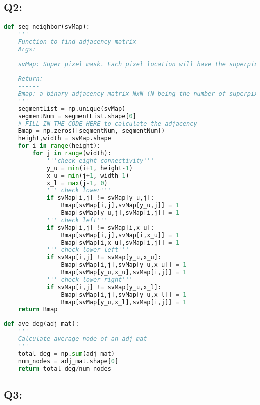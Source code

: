 \documentclass[12pt]{article}
\begin{document}
\subsection*{Q2:}
\begin{lstlisting}[language=Python]
def seg_neighbor(svMap):
	'''
	Function to find adjacency matrix
	Args:
	----
	svMap: Super pixel mask. Each pixel location will have the superpixel label corresponding to it.  
	
	Return:
	------
	Bmap: a binary adjacency matrix NxN (N being the number of superpixels	in svMap). 
	'''
	segmentList = np.unique(svMap)
	segmentNum = segmentList.shape[0]
	# FILL IN THE CODE HERE to calculate the adjacency
	Bmap = np.zeros([segmentNum, segmentNum])
	height,width = svMap.shape
	for i in range(height):
		for j in range(width):
			'''check eight connectivity'''
			y_u = min(i+1, height-1) 
			x_u = min(j+1, width-1)
			x_l = max(j-1, 0)
			''' check lower'''
			if svMap[i,j] != svMap[y_u,j]: 
				Bmap[svMap[i,j],svMap[y_u,j]] = 1
				Bmap[svMap[y_u,j],svMap[i,j]] = 1
			''' check left'''
			if svMap[i,j] != svMap[i,x_u]:
				Bmap[svMap[i,j],svMap[i,x_u]] = 1
				Bmap[svMap[i,x_u],svMap[i,j]] = 1
			''' check lower left'''
			if svMap[i,j] != svMap[y_u,x_u]:
				Bmap[svMap[i,j],svMap[y_u,x_u]] = 1
				Bmap[svMap[y_u,x_u],svMap[i,j]] = 1
			''' check lower right'''
			if svMap[i,j] != svMap[y_u,x_l]:
				Bmap[svMap[i,j],svMap[y_u,x_l]] = 1
				Bmap[svMap[y_u,x_l],svMap[i,j]] = 1
	return Bmap
\end{lstlisting}
\pagebreak	
\begin{lstlisting}[language=Python]	
def ave_deg(adj_mat):
	'''
	Calculate average node of an adj_mat
	'''
	total_deg = np.sum(adj_mat)
	num_nodes = adj_mat.shape[0]
	return total_deg/num_nodes
\end{lstlisting}
\vspace{3em}
\subsection*{Q3:}
\end{document}
